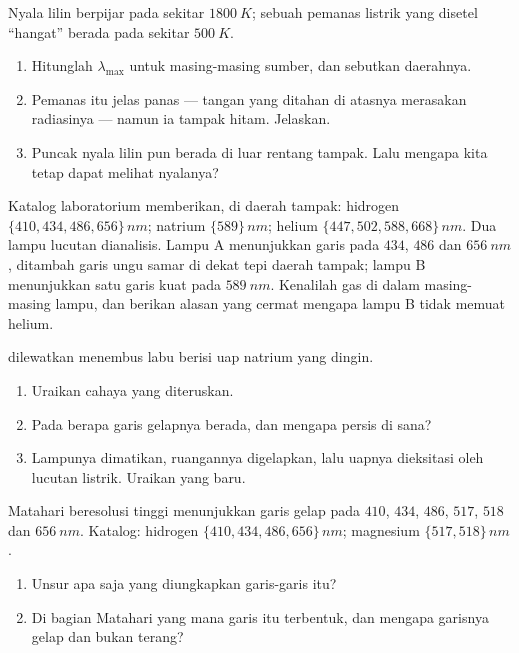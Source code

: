 \begin{exercise}[$\star\star$]\label{exo:g10:light-spectra:7}
Nyala lilin berpijar pada sekitar $\qty{1800}{K}$; sebuah pemanas
listrik yang disetel ``hangat'' berada pada sekitar $\qty{500}{K}$.
\begin{enumerate}
  \item Hitunglah $\lambda_{\max}$ untuk masing-masing sumber, dan
        sebutkan daerahnya.
  \item Pemanas itu jelas panas --- tangan yang ditahan di atasnya
        merasakan radiasinya --- namun ia tampak hitam. Jelaskan.
  \item Puncak nyala lilin pun berada di luar rentang tampak. Lalu
        mengapa kita tetap dapat melihat nyalanya?
\end{enumerate}
\end{exercise}

\begin{exercise}[$\star\star$]\label{exo:g10:light-spectra:8}
Katalog laboratorium memberikan, di daerah tampak: hidrogen
$\{410, 434, 486, 656\}\,\unit{nm}$; natrium $\{589\}\,\unit{nm}$;
helium $\{447, 502, 588, 668\}\,\unit{nm}$. Dua lampu lucutan
dianalisis. Lampu A menunjukkan garis pada $434$, $486$ dan
$\qty{656}{nm}$, ditambah garis ungu samar di dekat tepi daerah tampak;
lampu B menunjukkan satu garis kuat pada $\qty{589}{nm}$. Kenalilah gas
di dalam masing-masing lampu, dan berikan alasan yang cermat mengapa
lampu B tidak memuat helium.
\end{exercise}

\begin{exercise}[$\star\star$]\label{exo:g10:light-spectra:9}
 dilewatkan menembus labu berisi uap natrium yang dingin.
\begin{enumerate}
  \item Uraikan  cahaya yang diteruskan.
  \item Pada  berapa garis gelapnya berada, dan
        mengapa persis di sana?
  \item Lampunya dimatikan, ruangannya digelapkan, lalu uapnya
        dieksitasi oleh lucutan listrik. Uraikan  yang baru.
\end{enumerate}
\end{exercise}

\begin{exercise}[$\star\star$]\label{exo:g10:light-spectra:10}
 Matahari beresolusi tinggi menunjukkan garis gelap pada $410$,
$434$, $486$, $517$, $518$ dan $\qty{656}{nm}$. Katalog: hidrogen
$\{410, 434, 486, 656\}\,\unit{nm}$; magnesium $\{517, 518\}\,\unit{nm}$.
\begin{enumerate}
  \item Unsur apa saja yang diungkapkan garis-garis itu?
  \item Di bagian Matahari yang mana garis itu terbentuk, dan mengapa
        garisnya gelap dan bukan terang?
\end{enumerate}
\end{exercise}

